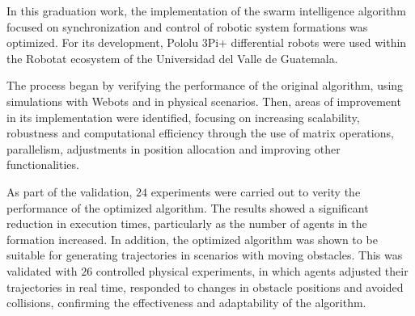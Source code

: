 In this graduation work, the implementation of the swarm intelligence algorithm focused on synchronization and control of robotic system formations was optimized. For its development, Pololu 3Pi+ differential robots were used within the Robotat ecosystem of the Universidad del Valle de Guatemala.

The process began by verifying the performance of the original algorithm, using simulations with Webots and in physical scenarios. Then, areas of improvement in its implementation were identified, focusing on increasing scalability, robustness and computational efficiency through the use of matrix operations, parallelism, adjustments in position allocation and improving other functionalities.

As part of the validation, $24$ experiments were carried out to verity the performance of the optimized algorithm. The results showed a significant reduction in execution times, particularly as the number of agents in the formation increased. In addition, the optimized algorithm was shown to be suitable for generating trajectories in scenarios with moving obstacles. This was validated with $26$ controlled physical experiments, in which agents adjusted their trajectories in real time, responded to changes in obstacle positions and avoided collisions, confirming the effectiveness and adaptability of the algorithm.